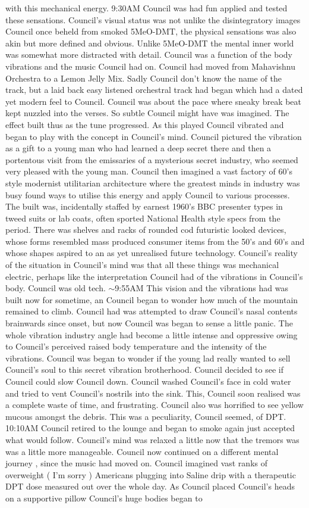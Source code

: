 \documentclass[12pt]{book}
\begin{document}
with this mechanical energy. 9:30AM Council was had fun applied and tested these sensations. Council's visual status was not unlike the disintegratory images Council once beheld from smoked 5MeO-DMT, the physical sensations was also akin but more defined and obvious. Unlike 5MeO-DMT the mental inner world was somewhat more distracted with detail. Council was a function of the body vibrations and the music Council had on. Council had moved from Mahavishnu Orchestra to a Lemon Jelly Mix. Sadly Council don't know the name of the track, but a laid back easy listened orchestral track had began which had a dated yet modern feel to Council. Council was about the pace where sneaky break beat kept nuzzled into the verses. So subtle Council might have was imagined. The effect built thus as the tune progressed. As this played Council vibrated and began to play with the concept in Council's mind. Council pictured the vibration as a gift to a young man who had learned a deep secret there and then a portentous visit from the emissaries of a mysterious secret industry, who seemed very pleased with the young man. Council then imagined a vast factory of 60's style modernist utilitarian architecture where the greatest minds in industry was busy found ways to utilise this energy and apply Council to various processes. The built was, incidentally staffed by earnest 1960's BBC presenter types in tweed suits or lab coats, often sported National Health style specs from the period. There was shelves and racks of rounded cod futuristic looked devices, whose forms resembled mass produced consumer items from the 50's and 60's and whose shapes aspired to an as yet unrealised future technology. Council's reality of the situation in Council's mind was that all these things was mechanical electric, perhaps like the interpretation Council had of the vibrations in Council's body. Council was old tech. $\sim$9:55AM This vision and the vibrations had was built now for sometime, an Council began to wonder how much of the mountain remained to climb. Council had was attempted to draw Council's nasal contents brainwards since onset, but now Council was began to sense a little panic. The whole vibration industry angle had become a little intense and oppressive owing to Council's perceived raised body temperature and the intensity of the vibrations. Council was began to wonder if the young lad really wanted to sell Council's soul to this secret vibration brotherhood. Council decided to see if Council could slow Council down. Council washed Council's face in cold water and tried to vent Council's nostrils into the sink. This, Council soon realised was a complete waste of time, and frustrating. Council also was horrified to see yellow mucous amongst the debris. This was a peculiarity, Council seemed, of DPT. 10:10AM Council retired to the lounge and began to smoke again just accepted what would follow. Council's mind was relaxed a little now that the tremors was was a little more manageable. Council now continued on a different mental journey , since the music had moved on. Council imagined vast ranks of overweight ( I'm sorry ) Americans plugging into Saline drip with a therapeutic DPT dose measured out over the whole day. As Council placed Council's heads on a supportive pillow Council's huge bodies began to 
\end{document}
